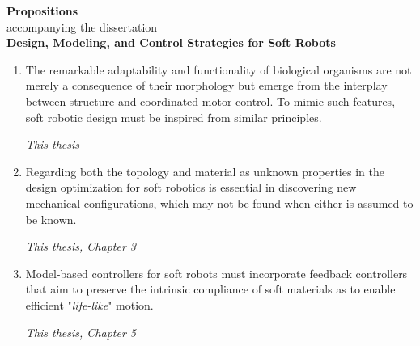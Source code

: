 \documentclass[a5paper]{article}
\renewcommand{\normalsize}{\fontsize{9}{9}\selectfont}
\newcommand{\largesize}{\fontsize{10}{9}\selectfont}
\begin{document}
\begin{center}
\largesize \textbf{Propositions} \\[0.45em]
\normalsize accompanying the dissertation \\[0.45em]
{\textbf{\largesize Design, Modeling, and Control Strategies for Soft Robots}}
\end{center}

\normalsize
\vspace{-1mm}

\begin{enumerate}
  \setlength\itemsep{0.65em}
  \item The remarkable adaptability and functionality of biological organisms are not merely a consequence of their morphology but emerge from the interplay between structure and coordinated motor control. To mimic such features, soft robotic design must be inspired from similar principles.
  \begin{flushright}
  \vspace{-5mm}
  \textit{This thesis}
  \vspace{-1mm}
  \end{flushright}

  \item Regarding both the topology and material as unknown properties in the design optimization for soft robotics is essential in discovering new mechanical configurations, which may not be found when either is assumed to be known. 
  \begin{flushright}
  \vspace{-5mm}
  \textit{This thesis, Chapter 3}
  \vspace{-1mm}
  \end{flushright}

  \item Model-based controllers for soft robots must incorporate feedback controllers that aim to preserve the intrinsic compliance of soft materials as to enable efficient "\textit{life-like}" motion.
  \begin{flushright}
  \vspace{-5mm}
  \textit{This thesis, Chapter 5}
  \vspace{-1mm}
  \end{flushright}
  

\end{enumerate}
\end{document}
